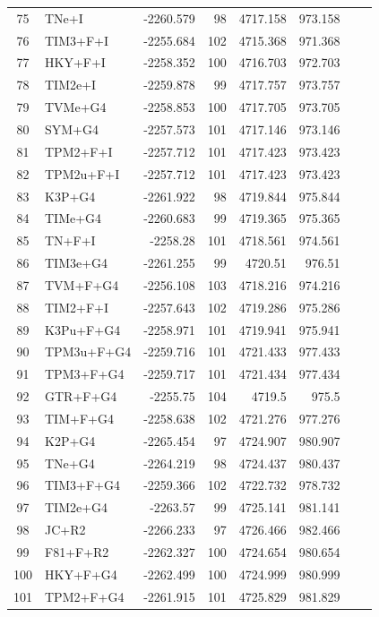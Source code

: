 \documentclass[fleqn,letterpaper]{article}
\begin{document}
\begin{longtable}{clrrrrrr}
	75 & TNe+I & -2260.579 & 98 & 4717.158 & 973.158 \\ 
	76 & TIM3+F+I & -2255.684 & 102 & 4715.368 & 971.368 \\ 
	77 & HKY+F+I & -2258.352 & 100 & 4716.703 & 972.703 \\ 
	78 & TIM2e+I & -2259.878 & 99 & 4717.757 & 973.757 \\ 
	79 & TVMe+G4 & -2258.853 & 100 & 4717.705 & 973.705 \\ 
	80 & SYM+G4 & -2257.573 & 101 & 4717.146 & 973.146 \\ 
	81 & TPM2+F+I & -2257.712 & 101 & 4717.423 & 973.423 \\ 
	82 & TPM2u+F+I & -2257.712 & 101 & 4717.423 & 973.423 \\ 
	83 & K3P+G4 & -2261.922 & 98 & 4719.844 & 975.844 \\ 
	84 & TIMe+G4 & -2260.683 & 99 & 4719.365 & 975.365 \\ 
	85 & TN+F+I & -2258.28 & 101 & 4718.561 & 974.561 \\ 
	86 & TIM3e+G4 & -2261.255 & 99 & 4720.51 & 976.51 \\ 
	87 & TVM+F+G4 & -2256.108 & 103 & 4718.216 & 974.216 \\ 
	88 & TIM2+F+I & -2257.643 & 102 & 4719.286 & 975.286 \\ 
	89 & K3Pu+F+G4 & -2258.971 & 101 & 4719.941 & 975.941 \\ 
	90 & TPM3u+F+G4 & -2259.716 & 101 & 4721.433 & 977.433 \\ 
	91 & TPM3+F+G4 & -2259.717 & 101 & 4721.434 & 977.434 \\ 
	92 & GTR+F+G4 & -2255.75 & 104 & 4719.5 & 975.5 \\ 
	93 & TIM+F+G4 & -2258.638 & 102 & 4721.276 & 977.276 \\ 
	94 & K2P+G4 & -2265.454 & 97 & 4724.907 & 980.907 \\ 
	95 & TNe+G4 & -2264.219 & 98 & 4724.437 & 980.437 \\ 
	96 & TIM3+F+G4 & -2259.366 & 102 & 4722.732 & 978.732 \\ 
	97 & TIM2e+G4 & -2263.57 & 99 & 4725.141 & 981.141 \\ 
	98 & JC+R2 & -2266.233 & 97 & 4726.466 & 982.466 \\ 
	99 & F81+F+R2 & -2262.327 & 100 & 4724.654 & 980.654 \\ 
	100 & HKY+F+G4 & -2262.499 & 100 & 4724.999 & 980.999 \\ 
	101 & TPM2+F+G4 & -2261.915 & 101 & 4725.829 & 981.829 \\ 

\end{longtable}
\end{document}
